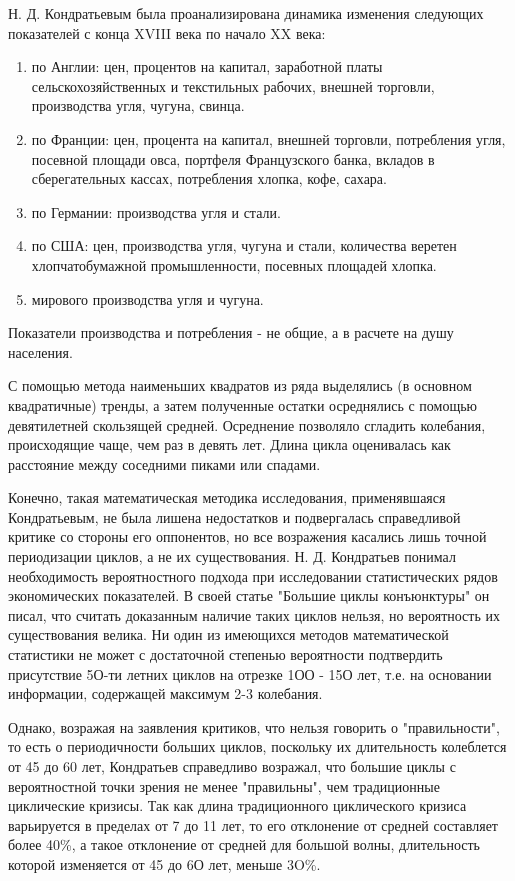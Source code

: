 \documentclass[a4paper,14pt]{extarticle}
\begin{document}
 	Н. Д. Кондратьевым была проанализирована динамика изменения следующих показателей с конца XVIII века по начало XX века:
 	
 	\begin{enumerate}
 		\item по Англии: цен, процентов на капитал, заработной платы сельскохозяйственных и текстильных рабочих, внешней торговли, производства угля, чугуна, свинца.
 		\item по Франции: цен, процента на капитал, внешней торговли, потребления угля, посевной площади овса, портфеля Французского банка, вкладов в сберегательных кассах, потребления хлопка, кофе, сахара.
 		\item по Германии: производства угля и стали.
 		\item по США: цен, производства угля, чугуна и стали, количества веретен хлопчатобумажной промышленности, посевных площадей хлопка.
 		\item мирового производства угля и чугуна.
 	\end{enumerate}
 	
 	Показатели производства и потребления - не общие, а в расчете на душу населения.
 	
 	С помощью метода наименьших квадратов из ряда выделялись (в основном квадратичные) тренды, а затем полученные остатки осреднялись с помощью девятилетней скользящей средней. Осреднение позволяло сгладить колебания, происходящие чаще, чем раз в девять лет. Длина цикла оценивалась как расстояние между соседними пиками или спадами.
 	
 	Конечно, такая математическая методика исследования, применявшаяся Кондратьевым, не была лишена недостатков и подвергалась справедливой критике со стороны его оппонентов, но все возражения касались лишь точной периодизации циклов, а не их существования. Н. Д. Кондратьев понимал необходимость вероятностного подхода при исследовании статистических рядов экономических показателей. В своей статье "Большие циклы конъюнктуры" он писал, что считать доказанным наличие таких циклов нельзя, но вероятность их существования велика. Ни один из имеющихся методов математической статистики не может с достаточной степенью вероятности подтвердить присутствие 5О-ти летних циклов на отрезке 1ОО - 15О лет, т.е. на основании информации, содержащей максимум 2-3 колебания.
 	
 	Однако, возражая на заявления критиков, что нельзя говорить о
 	"правильности", то есть о периодичности больших циклов, поскольку их длительность колеблется от 45 до 60 лет, Кондратьев справедливо возражал, что большие циклы с вероятностной точки зрения не менее "правильны", чем традиционные циклические кризисы. Так как длина традиционного циклического кризиса варьируется в пределах от 7 до 11 лет, то его отклонение от средней составляет более 40\%, а такое отклонение от средней для большой волны, длительность которой изменяется от 45 до 6О лет, меньше 3O\%.
 	
\end{document}
